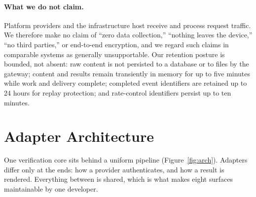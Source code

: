 \paragraph{What we do not claim.}
Platform providers and the infrastructure host receive and process request traffic. We
therefore make no claim of ``zero data collection,'' ``nothing leaves the device,'' ``no
third parties,'' or end-to-end encryption, and we regard such claims in comparable systems
as generally unsupportable. Our retention posture is bounded, not absent: raw content is
not persisted to a database or to files by the gateway; content and results remain
transiently in memory for up to five minutes while work and delivery complete; completed
event identifiers are retained up to 24 hours for replay protection; and rate-control
identifiers persist up to ten minutes.

\section{Adapter Architecture}

One verification core sits behind a uniform pipeline (Figure~\ref{fig:arch}). Adapters
differ only at the ends: how a provider authenticates, and how a result is rendered.
Everything between is shared, which is what makes eight surfaces maintainable by one
developer.

